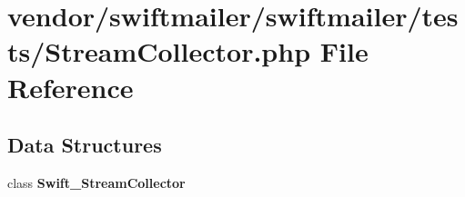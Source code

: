 \section{vendor/swiftmailer/swiftmailer/tests/\+Stream\+Collector.php File Reference}
\label{_stream_collector_8php}
\subsection*{Data Structures}
\begin{DoxyCompactItemize}
\item 
class {\bf Swift\+\_\+\+Stream\+Collector}
\end{DoxyCompactItemize}
